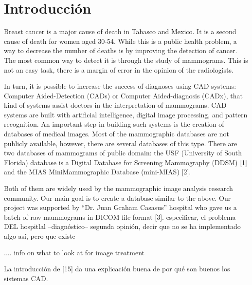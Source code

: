 \chapter{Introducción}

Breast cancer is a major cause of death in Tabasco and Mexico. It is a second
cause of death for women aged 30-54. While this is a public health problem, a
way to decrease the number of deaths is by improving the detection of cancer.
The most common way to detect it is through the study of mammograms. This is
not an easy task, there is a margin of error in the opinion of the
radiologists.

In turn, it is possible to increase the success of diagnoses
using CAD systems: Computer Aided-Detection (CADs) or Computer Aided-diagnosis
(CADx), that kind of systems assist doctors in the interpretation of
mammograms. CAD systems are built with artificial intelligence, digital image
processing, and pattern recognition.  An important step in building such
systems is the creation of databases of medical images. Most of the
mammographic databases are not publicly available, however, there are several
databases of this type. There are two databases of mammograms of public domain:
the USF (University of South Florida) database is a Digital Database for
Screening Mammography (DDSM) [1] and the MIAS MiniMammographic Database
(mini-MIAS) [2]. 

Both of them are widely used by the mammographic image analysis research
community.  Our main goal is to create a database similar to the above.  Our
project was supported by “Dr. Juan Graham Casasus” hospital who gave us a batch
of raw mammograms in DICOM file format [3].  especificar, el problema DEL
hospitlal --diagnóstico-- segunda opinión, decir que no se ha implementado algo
así, pero que existe
 
.... info on what to look at for image treatment 

La introducción de [15] da una explicación buena de por qué son buenos los
sistemas CAD.


